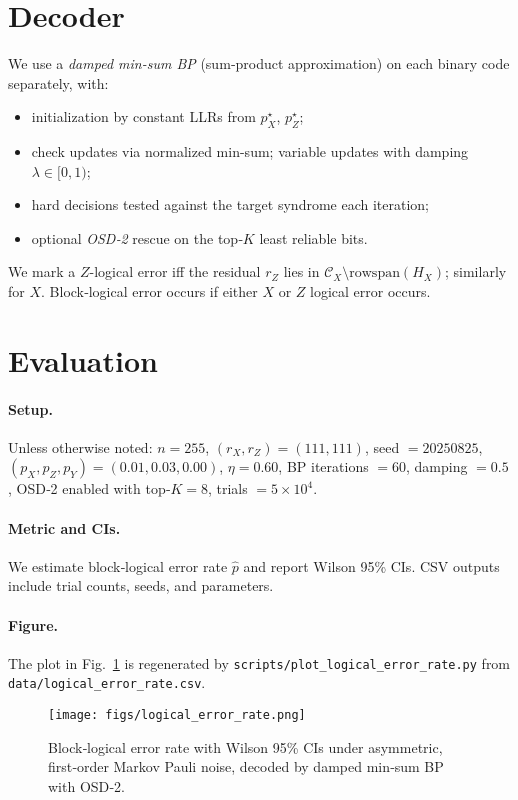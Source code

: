 \documentclass[11pt]{article}
\begin{document}
\section{Decoder}
\label{sec:decoder}
We use a \emph{damped min-sum BP} (sum‑product approximation) on each binary
code separately, with:
\begin{itemize}
  \item initialization by constant LLRs from \(p_X^\star\), \(p_Z^\star\);
  \item check updates via normalized min-sum; variable updates with damping
        \(\lambda\in[0,1)\);
  \item hard decisions tested against the target syndrome each iteration;
  \item optional \emph{OSD‑2} rescue on the top‑\(K\) least reliable bits.
\end{itemize}
We mark a \(Z\)-logical error iff the residual \(r_Z\) lies in
\( \mathcal{C}_X \setminus \mathrm{rowspan}(H_X)\); similarly for \(X\).
Block‑logical error occurs if either \(X\) or \(Z\) logical error occurs.

\section{Evaluation}
\label{sec:evaluation}
\paragraph{Setup.}
Unless otherwise noted: \(n=255\), \((r_X,r_Z)=(111,111)\),
seed \(=20250825\), \((p_X,p_Z,p_Y)=(0.01,0.03,0.00)\), \(\eta=0.60\),
BP iterations \(=60\), damping \(=0.5\), OSD‑2 enabled with top‑\(K=8\),
trials \(=5\times 10^4\).

\paragraph{Metric and CIs.}
We estimate block‑logical error rate \(\hat{p}\) and report Wilson 95\% CIs.
CSV outputs include trial counts, seeds, and parameters.

\paragraph{Figure.}
The plot in Fig.~\ref{fig:ler} is regenerated by
\texttt{scripts/plot\_logical\_error\_rate.py} from
\texttt{data/logical\_error\_rate.csv}.

\begin{figure}[t]
  \centering
  \texttt{[image: figs/logical\_error\_rate.png]}
  \caption{Block‑logical error rate with Wilson 95\% CIs under asymmetric,
  first‑order Markov Pauli noise, decoded by damped min‑sum BP with OSD‑2.}
  \label{fig:ler}
\end{figure}
\end{document}

